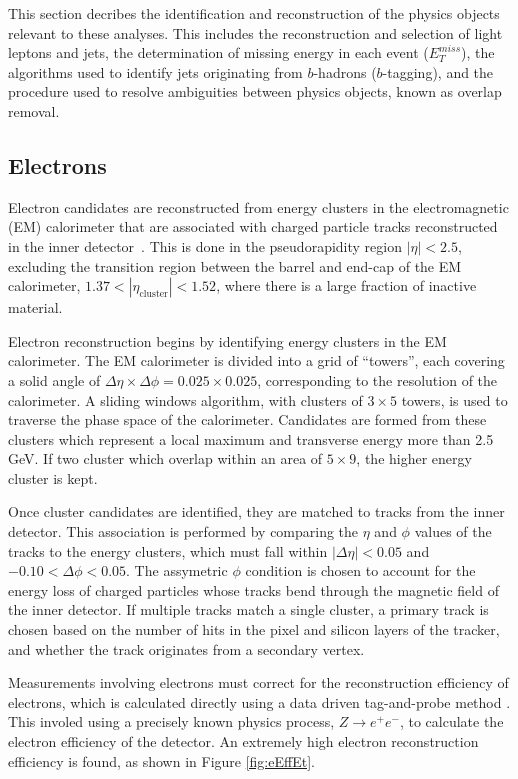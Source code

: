 
This section decribes the identification and reconstruction of the physics objects relevant to these analyses. This includes the reconstruction and selection of light leptons and jets, the determination of missing energy in each event ($E_T^{miss}$), the algorithms used to identify jets originating from $b$-hadrons ($b$-tagging), and the procedure used to resolve ambiguities between physics objects, known as overlap removal.

\subsection{Electrons}

Electron candidates are reconstructed from energy clusters in the electromagnetic (EM) calorimeter that are associated with charged particle tracks reconstructed in the inner detector~\cite{ATLAS-CONF-2016-024}. This is done in the pseudorapidity region $|\eta| < 2.5$, excluding the transition region between the barrel and end-cap of the EM calorimeter, $1.37 < |\eta_\textrm{cluster}| < 1.52$, where there is a large fraction of inactive material.            

Electron reconstruction begins by identifying energy clusters in the EM calorimeter. The EM calorimeter is divided into a grid of ``towers'', each covering a solid angle of $\Delta\eta\times\Delta\phi = 0.025\times 0.025$, corresponding to the resolution of the calorimeter. A sliding windows algorithm, with clusters of $3\times 5$ towers, is used to traverse the phase space of the calorimeter. Candidates are formed from these clusters which represent a local maximum and transverse energy more than 2.5 GeV. If two cluster which overlap within an area of $5\times 9$, the higher energy cluster is kept.

Once cluster candidates are identified, they are matched to tracks from the inner detector. This association is performed by comparing the $\eta$ and $\phi$ values of the tracks to the energy clusters, which must fall within $|\Delta\eta| < 0.05$ and $-0.10 < \Delta\phi < 0.05$. The assymetric $\phi$ condition is chosen to account for the energy loss of charged particles whose tracks bend through the magnetic field of the inner detector. If multiple tracks match a single cluster, a primary track is chosen based on the number of hits in the pixel and silicon layers of the tracker, and whether the track originates from a secondary vertex.

Measurements involving electrons must correct for the reconstruction efficiency of electrons, which is calculated directly using a data driven tag-and-probe method \cite{tagAndProbe}. This involed using a precisely known physics process, $Z\rightarrow e^+e^-$, to calculate the electron efficiency of the detector. An extremely high electron reconstruction efficiency is found, as shown in Figure \ref{fig:eEffEt}.

